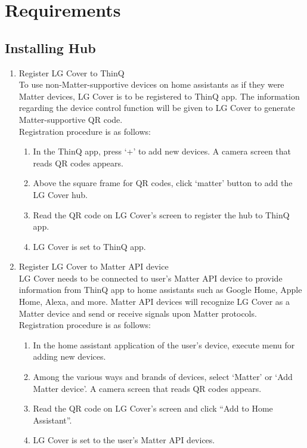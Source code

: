 \documentclass[conference]{IEEEtran}
\begin{document}
\section{\large{Requirements}}
\subsection{\large{Installing Hub}}
\begin{enumerate}[label=\arabic*.]
\item {\large{Register LG Cover to ThinQ}}\\
To use non-Matter-supportive devices on home assistants as if they were Matter devices, LG Cover is to be registered to ThinQ app. The information regarding the device control function will be given to LG Cover to generate Matter-supportive QR code.\\
Registration procedure is as follows:\\
\begin{enumerate}[label=\alph*.]
\item In the ThinQ app, press ‘+’ to add new devices. A camera screen that reads QR codes appears.\\
\item Above the square frame for QR codes, click ‘matter’ button to add the LG Cover hub. \\
\item Read the QR code on LG Cover’s screen to register the hub to ThinQ app. \\
\item LG Cover is set to ThinQ app.\\
\end{enumerate}

\item {\large{Register LG Cover to Matter API device}}\\
LG Cover needs to be connected to user’s Matter API device to provide information from ThinQ app to home assistants such as Google Home, Apple Home, Alexa, and more. Matter API devices will recognize LG Cover as a Matter device and send or receive signals upon Matter protocols.\\
Registration procedure is as follows:\\
\begin{enumerate}[label=\alph*.]
\item In the home assistant application of the user’s device, execute menu for adding new devices.\\
\item Among the various ways and brands of devices, select ‘Matter’ or ‘Add Matter device’. A camera screen that reads QR codes appears. \\
\item Read the QR code on LG Cover’s screen and click “Add to Home Assistant”. \\
\item LG Cover is set to the user’s Matter API devices.\\
\end{enumerate}
\end{enumerate}
\end{document}
